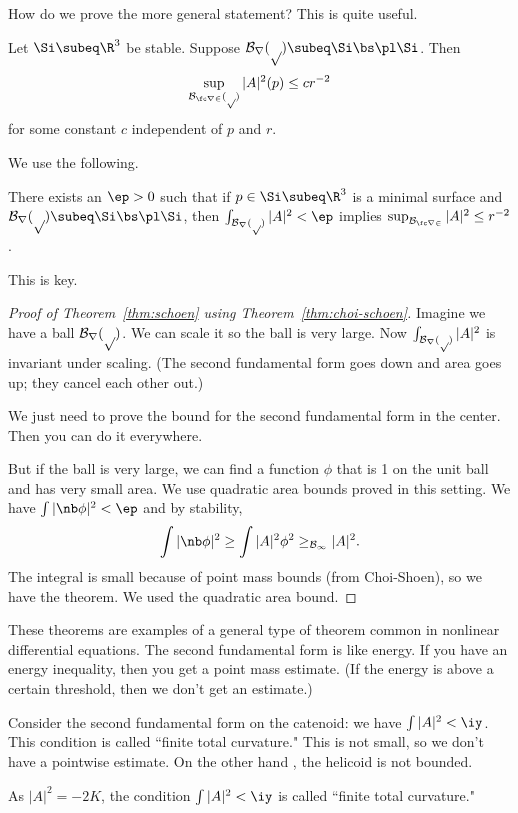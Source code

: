 How do we prove the more general statement? This is quite useful. 
\begin{thm}[Schoen, 1982]
Let $\Si\subeq \R^3$ be stable. Suppose $\cal B_r(p)\subeq \Si\bs \pl \Si$. Then
\[
\sup_{\cal B_{\fc r2}(p)}|A|^2(p)\le cr^{-2}
\]
for some constant $c$ independent of $p$ and $r$.
\end{thm}
We use the following.
\begin{thm}
There exists an $\ep>0$ such that if $p\in\Si\subeq \R^3$ is a minimal surface and $\cal B_r(p)\subeq \Si\bs \pl \Si$, then 
$\int_{\cal B_r(p)} |A|^2<\ep$  implies $\sup_{\cal B_{\fc r2}}|A|^2\le r^{-2}$.
\end{thm}
This is key.
\begin{proof}[Proof of Theorem~\eqref{thm:schoen} using Theorem~\eqref{thm:choi-schoen}]
Imagine we have a ball $\cal B_r(p)$. We can scale it so the ball is very large. Now $\int_{\cal B_r(p)}|A|^2$ is invariant under scaling. (The second fundamental form goes down and area goes up; they cancel each other out.) %

We just need to prove the bound for the second fundamental form in the center. Then you can do it everywhere. %

But if the ball is very large, we can find a function $\phi$ that is 1 on the unit ball and has very small area. We use quadratic area bounds proved in this setting. We have $\int|\nb \phi|^2< \ep$ and by stability,
\[
\int|\nb\phi|^2\ge \int|A|^2\phi^2\ge_{\cal B_1}|A|^2.
\]
The integral is small because of point mass bounds (from Choi-Shoen), so we have the theorem. %
We used the quadratic area bound.
\end{proof}

These theorems are examples of a general type of theorem common in nonlinear differential equations. 
The second fundamental  form is like energy. 
If you have an energy inequality, then you get a point mass estimate. (If the energy is above a certain threshold, then we don't get an estimate.)

Consider the second fundamental form on the catenoid: we have $\int|A|^2<\iy$. This condition is called ``finite total curvature." This is not small, so we don't have a pointwise estimate. On the other hand , the helicoid is not bounded. 

As $|A|^2=-2K$, the condition $\int|A|^2<\iy$ is called ``finite total curvature." %

